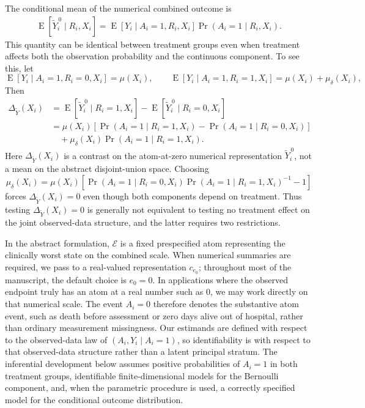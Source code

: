 \documentclass[11pt]{article}
\DeclareMathOperator*{\E}{E}
\begin{document}
The conditional mean of the numerical combined outcome is
\begin{align*}
  \E[\widetilde{Y}_i^{\,0} \mid R_i, X_i]
  = \E[Y_i \mid A_i = 1, R_i, X_i]\Pr(A_i = 1 \mid R_i, X_i).
\end{align*}
This quantity can be identical between treatment groups even when treatment affects both the observation probability and the continuous component. To see this, let
\[
\E[Y_i \mid A_i = 1, R_i = 0, X_i] = \mu(X_i), \qquad
\E[Y_i \mid A_i = 1, R_i = 1, X_i] = \mu(X_i) + \mu_\delta(X_i),
\]
Then
\begin{align}
  \Delta_{\widetilde{Y}}(X_i)
  &= \E[\widetilde{Y}_i^{\,0} \mid R_i = 1, X_i] - \E[\widetilde{Y}_i^{\,0} \mid R_i = 0, X_i]\label{eq:Delta}\\
  &= \mu(X_i)\left[\Pr(A_i = 1 \mid R_i = 1, X_i) - \Pr(A_i = 1 \mid R_i = 0, X_i)\right]\nonumber\\
  &\quad + \mu_\delta(X_i)\Pr(A_i = 1 \mid R_i = 1, X_i).\nonumber
\end{align}
Here $\Delta_{\widetilde{Y}}(X_i)$ is a contrast on the atom-at-zero numerical representation $\widetilde{Y}_i^{\,0}$, not a mean on the abstract disjoint-union space.
Choosing
\[
\mu_\delta(X_i)
= \mu(X_i)\left[\Pr(A_i = 1 \mid R_i = 0, X_i)\Pr(A_i = 1 \mid R_i = 1, X_i)^{-1} - 1\right]
\]
forces $\Delta_{\widetilde{Y}}(X_i)=0$ even though both components depend on treatment. Thus testing $\Delta_{\widetilde{Y}}(X_i)=0$ is generally not equivalent to testing no treatment effect on the joint observed-data structure, and the latter requires two restrictions.

In the abstract formulation, $\mathcal{E}$ is a fixed prespecified atom representing the clinically worst state on the combined scale. When numerical summaries are required, we pass to a real-valued representation $c_{e_0}$; throughout most of the manuscript, the default choice is $e_0 = 0$. In applications where the observed endpoint truly has an atom at a real number such as $0$, we may work directly on that numerical scale. The event $A_i = 0$ therefore denotes the substantive atom event, such as death before assessment or zero days alive out of hospital, rather than ordinary measurement missingness. Our estimands are defined with respect to the observed-data law of $(A_i, Y_i \mid A_i = 1)$, so identifiability is with respect to that observed-data structure rather than a latent principal stratum. The inferential development below assumes positive probabilities of $A_i = 1$ in both treatment groups, identifiable finite-dimensional models for the Bernoulli component, and, when the parametric procedure is used, a correctly specified model for the conditional outcome distribution.
\end{document}
